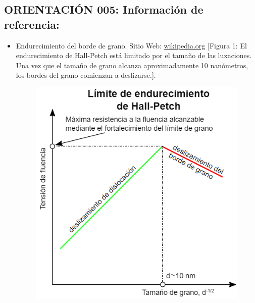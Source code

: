 \documentclass[12pt,a4paper]{article}
\begin{document}
    \subsection{ORIENTACIÓN 005: Información de referencia:}
    \begin{itemize}
        \item Endurecimiento del borde de grano.  Sitio Web: \href{https://es.wikipedia.org/wiki/Endurecimiento_del_borde_de_grano}{wikipedia.org} [Figura 1: El endurecimiento de Hall-Petch está limitado por el tamaño de las luxaciones. Una vez que el tamaño de grano alcanza aproximadamente 10 nanómetros, los bordes del grano comienzan a deslizarse.].
        \begin{figure}[h]
            \centering
            \includegraphics[width=0.5\linewidth]{figuras/imagen 3.png}
            \label{fig:enter-label}
        \end{figure}
    \end{itemize}
\end{document}
